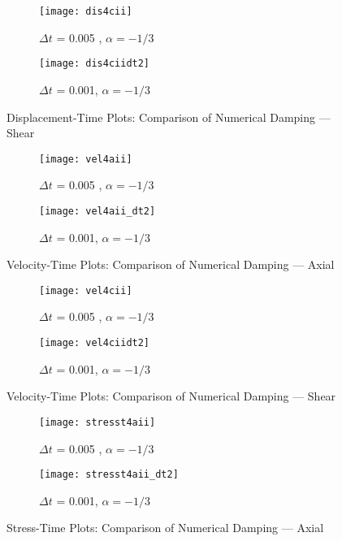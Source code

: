\begin{figure}[htbp]
\centering
\begin{subfigure}{.5\textwidth}
  \centering
  \texttt{[image: dis4cii]}
  \caption{$\Delta t$ = 0.005 , $\alpha = -1/3$}
  \label{fig:sub1}
\end{subfigure}%
\begin{subfigure}{.5\textwidth}
  \centering
  \texttt{[image: dis4ciidt2]}
  \caption{$\Delta t$ = 0.001, $\alpha = -1/3$}
  \label{fig:sub2}
\end{subfigure}
\caption{ Displacement-Time Plots: Comparison of Numerical Damping --- Shear }
\end{figure}
\begin{figure}[htbp]
\centering
\begin{subfigure}{.5\textwidth}
  \centering
  \texttt{[image: vel4aii]}
  \caption{$\Delta t$ = 0.005 , $\alpha = -1/3$}
  \label{fig:sub1}
\end{subfigure}%
\begin{subfigure}{.5\textwidth}
  \centering
  \texttt{[image: vel4aii\_dt2]}
  \caption{$\Delta t$ = 0.001, $\alpha = -1/3$}
  \label{fig:sub2}
\end{subfigure}
\caption{ Velocity-Time Plots: Comparison of Numerical Damping --- Axial }
\end{figure}
\begin{figure}[htbp]
\centering
\begin{subfigure}{.5\textwidth}
  \centering
  \texttt{[image: vel4cii]}
  \caption{$\Delta t$ = 0.005 , $\alpha = -1/3$}
  \label{fig:sub1}
\end{subfigure}%
\begin{subfigure}{.5\textwidth}
  \centering
  \texttt{[image: vel4ciidt2]}
  \caption{$\Delta t$ = 0.001, $\alpha = -1/3$}
  \label{fig:sub2}
\end{subfigure}
\caption{ Velocity-Time Plots: Comparison of Numerical Damping --- Shear }
\end{figure}
\begin{figure}[htbp]
\centering
\begin{subfigure}{.5\textwidth}
  \centering
  \texttt{[image: stresst4aii]}
  \caption{$\Delta t$ = 0.005 , $\alpha = -1/3$}
  \label{fig:sub1}
\end{subfigure}%
\begin{subfigure}{.5\textwidth}
  \centering
  \texttt{[image: stresst4aii\_dt2]}
  \caption{$\Delta t$ = 0.001, $\alpha = -1/3$}
  \label{fig:sub2}
\end{subfigure}
\caption{ Stress-Time Plots: Comparison of Numerical Damping --- Axial }
\end{figure}
